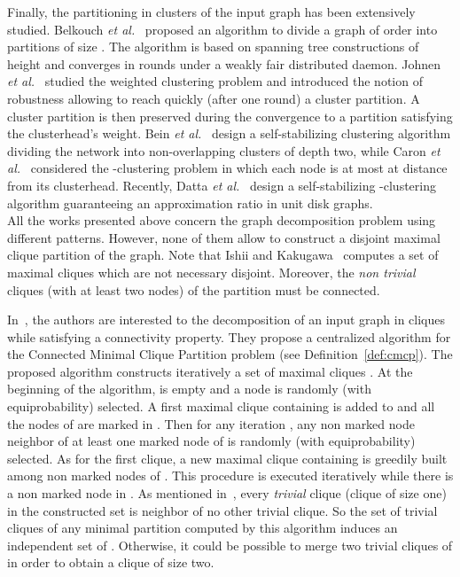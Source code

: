 \documentclass[11pt,letterpaper,onecolumn]{article}
\begin{document}
Finally, the partitioning in clusters of the input graph has been extensively studied. Belkouch \emph{et al.}~\cite{BelkouchBCD02} proposed an algorithm to divide a graph of order  into  partitions of size . The algorithm is based on spanning tree constructions of height  and converges in  rounds under a weakly fair distributed daemon. Johnen \emph{et al.}~\cite{JohnenN09} studied the weighted clustering problem and introduced the notion of robustness allowing to reach quickly (after one round) a cluster partition. A cluster partition is then preserved during the convergence to a partition satisfying the clusterhead's weight. Bein \emph{et al.}~\cite{BeinDJV05} design a self-stabilizing clustering algorithm dividing the network into non-overlapping clusters of depth two, while Caron \emph{et al.}~\cite{CaronDDL10} considered the -clustering problem in which each node is at most at distance  from its clusterhead. Recently, Datta \emph{et al.}~\cite{DattaLDHR12} design a self-stabilizing -clustering algorithm guaranteeing an approximation ratio in unit disk graphs.\\

All the works presented above concern the graph decomposition problem using different patterns. However, none of them allow to construct a disjoint maximal clique partition of the graph. Note that Ishii and Kakugawa~\cite{IshiiK02} computes a set of maximal cliques which are not necessary disjoint. Moreover, the \emph{non trivial} cliques (with at least two nodes) of the partition must be connected. 

 In~\cite{DelbotLP13}, the authors are interested to the decomposition of an input graph in cliques while satisfying a connectivity property. They propose a centralized algorithm for the Connected Minimal Clique Partition problem (see Definition~\ref{def:cmcp}). The proposed algorithm constructs iteratively a set of maximal cliques . At the beginning of the algorithm,  is empty and a node  is randomly (with equiprobability) selected. A first maximal clique  containing  is added to  and all the nodes of  are marked in . Then for any iteration , any non marked node  neighbor of at least one marked node of  is randomly (with equiprobability) selected. As for the first clique, a new maximal clique containing  is greedily built among non marked nodes of . This procedure is executed 
iteratively while there is a non marked node in . As mentioned in~\cite{DelbotLP13}, every \emph{trivial} clique (clique of size one) in the constructed set  is neighbor of no other trivial clique. So the set of trivial cliques of any minimal partition computed by this algorithm induces an independent set of . Otherwise, it could be possible to merge two trivial cliques of  in order to obtain a clique of size two.
\end{document}
